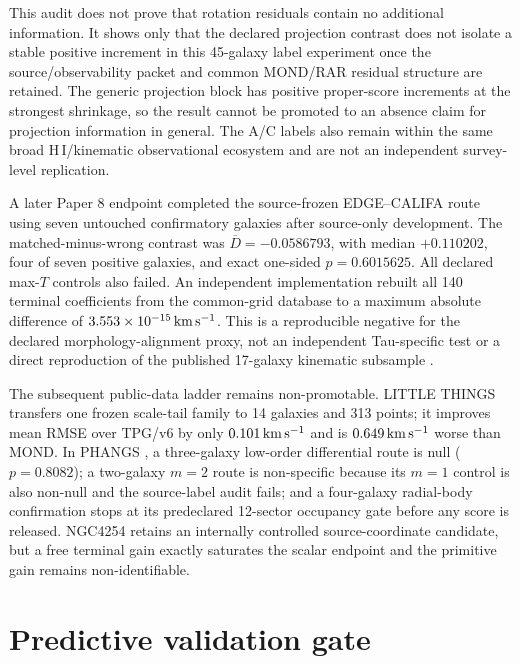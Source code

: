 \documentclass[11pt]{article}
\begin{document}
This audit does not prove that rotation residuals contain no additional information. It shows only that the declared projection contrast does not isolate a stable positive increment in this 45-galaxy label experiment once the source/observability packet and common MOND/RAR residual structure are retained. The generic projection block has positive proper-score increments at the strongest shrinkage, so the result cannot be promoted to an absence claim for projection information in general. The A/C labels also remain within the same broad H\,I/kinematic observational ecosystem and are not an independent survey-level replication.

A later Paper 8 endpoint completed the source-frozen EDGE--CALIFA route using seven untouched confirmatory galaxies after source-only development. The matched-minus-wrong contrast was $\overline D=-0.0586793$, with median $+0.110202$, four of seven positive galaxies, and exact one-sided $p=0.6015625$. All declared max-$T$ controls also failed. An independent implementation rebuilt all 140 terminal coefficients from the common-grid database \cite{Wong2024EDGEDatabase} to a maximum absolute difference of $3.553\times10^{-15}\,{\rm km\,s^{-1}}$. This is a reproducible negative for the declared morphology-alignment proxy, not an independent Tau-specific test or a direct reproduction of the published 17-galaxy kinematic subsample \cite{Levy2018EDGEKinematics}.

The subsequent public-data ladder remains non-promotable. LITTLE THINGS \cite{Oh2015LITTLETHINGS} transfers one frozen scale-tail family to 14 galaxies and 313 points; it improves mean RMSE over TPG/v6 by only $0.101\,{\rm km\,s^{-1}}$ and is $0.649\,{\rm km\,s^{-1}}$ worse than MOND. In PHANGS \cite{Lang2020PHANGSKinematics,Emsellem2022PHANGSMUSE,Querejeta2021PHANGSStructures}, a three-galaxy low-order differential route is null ($p=0.8082$); a two-galaxy $m=2$ route is non-specific because its $m=1$ control is also non-null and the source-label audit fails; and a four-galaxy radial-body confirmation stops at its predeclared 12-sector occupancy gate before any score is released. NGC4254 retains an internally controlled source-coordinate candidate, but a free terminal gain exactly saturates the scalar endpoint and the primitive gain remains non-identifiable.

\section{Predictive validation gate}
\end{document}
